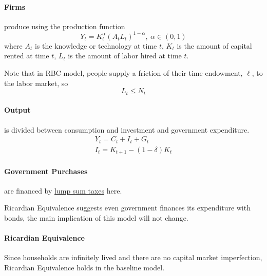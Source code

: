 \documentclass[11pt]{article}
\begin{document}
			\paragraph{Firms} produce using the production function
			\begin{equation}
				Y_t = K_t^\alpha (A_t L_t)^{1-\alpha},\ \alpha \in (0,1)
			\end{equation}
			where $A_t$ is the knowledge or technology at time $t$, $K_t$ is the amount of capital rented at time $t$, $L_t$ is the amount of labor hired at time $t$.
			\begin{remark}
				Note that in RBC model, people supply a friction of their time endowment, $\ell$, to the labor market, so 
				\[
					L_t \leq N_t
				\]
			\end{remark}
			
			\paragraph{Output} is divided between consumption and investment and government expenditure.
			\begin{gather}
				Y_t = C_t + I_t + G_t \\
				I_t = K_{t+1} - (1-\delta)K_t
			\end{gather}
			
			\paragraph{Government Purchases} are financed by \ul{lump sum taxes} here.
			\begin{remark}
				Ricardian Equivalence suggests even government finances its expenditure with bonds, the main implication of this model will not change.
			\end{remark}
			
			\paragraph{Ricardian Equivalence} Since households are infinitely lived and there are no capital market imperfection, Ricardian Equivalence holds in the baseline model.
			
\end{document}
